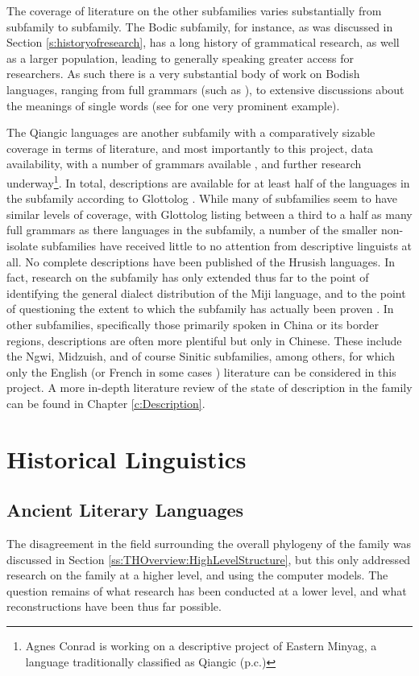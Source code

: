 The coverage of literature on the other subfamilies varies substantially from subfamily to subfamily. The Bodic subfamily, for instance, as was discussed in Section \ref{s:historyofresearch}, has a long history of grammatical research, as well as a larger population, leading to generally speaking greater access for researchers. As such there is a very substantial body of work on Bodish languages, ranging from full grammars (such as ), to extensive discussions about the meanings of single words (see  for one very prominent example).

The Qiangic languages are another subfamily with a comparatively sizable coverage in terms of literature, and most importantly to this project, data availability, with a number of grammars available \cites{LaPolla2003}{Ding2014}, and further research underway\footnote{Agnes Conrad is working on a descriptive project of Eastern Minyag, a language traditionally classified as Qiangic (p.c.)}. In total, descriptions are available for at least half of the languages in the subfamily according to Glottolog \cite{glottolog}. While many of subfamilies seem to have similar levels of coverage, with Glottolog listing between a third to a half as many full grammars as there languages in the subfamily, a number of the smaller non-isolate subfamilies have received little to no attention from descriptive linguists at all. No complete descriptions have been published of the Hrusish languages. In fact, research on the subfamily has only extended thus far to the point of identifying the general dialect distribution of the Miji language, and to the point of questioning the extent to which the subfamily has actually been proven \cite{Post2017}. In other subfamilies, specifically those primarily spoken in China or its border regions, descriptions are often more plentiful but only in Chinese. These include the Ngwi, Midzuish, and of course Sinitic subfamilies, among others, for which only the English (or French in some cases \cite{Lai2017}) literature can be considered in this project. A more in-depth literature review of the state of description in the family can be found in Chapter \ref{c:Description}.
\section{Historical Linguistics}
\subsection{Ancient Literary Languages}\label{s:AncientLiteraryLanguages}
The disagreement in the field surrounding the overall phylogeny of the family was discussed in Section \ref{ss:THOverview:HighLevelStructure}, but this only addressed research on the family at a higher level, and using the computer models. The question remains of what research has been conducted at a lower level, and what reconstructions have been thus far possible.

